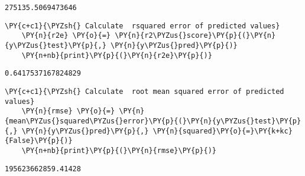         \begin{Verbatim}[commandchars=\\\{\}]
    275135.5069473646
        \end{Verbatim}
    
        \begin{tcolorbox}[breakable, size=fbox, boxrule=1pt, pad at break*=1mm,colback=cellbackground, colframe=cellborder]
    \begin{Verbatim}[commandchars=\\\{\}]
    \PY{c+c1}{\PYZsh{} Calculate  rsquared error of predicted values}
    \PY{n}{r2e} \PY{o}{=} \PY{n}{r2\PYZus{}score}\PY{p}{(}\PY{n}{y\PYZus{}test}\PY{p}{,} \PY{n}{y\PYZus{}pred}\PY{p}{)}
    \PY{n+nb}{print}\PY{p}{(}\PY{n}{r2e}\PY{p}{)}
    \end{Verbatim}
    \end{tcolorbox}
    
        \begin{Verbatim}[commandchars=\\\{\}]
    0.6417537167824829
        \end{Verbatim}
    
        \begin{tcolorbox}[breakable, size=fbox, boxrule=1pt, pad at break*=1mm,colback=cellbackground, colframe=cellborder]
    \begin{Verbatim}[commandchars=\\\{\}]
    \PY{c+c1}{\PYZsh{} Calculate  root mean squared error of predicted values}
    \PY{n}{rmse} \PY{o}{=} \PY{n}{mean\PYZus{}squared\PYZus{}error}\PY{p}{(}\PY{n}{y\PYZus{}test}\PY{p}{,} \PY{n}{y\PYZus{}pred}\PY{p}{,} \PY{n}{squared}\PY{o}{=}\PY{k+kc}{False}\PY{p}{)}
    \PY{n+nb}{print}\PY{p}{(}\PY{n}{rmse}\PY{p}{)}
    \end{Verbatim}
    \end{tcolorbox}
    
        \begin{Verbatim}[commandchars=\\\{\}]
    195623662859.41428
        \end{Verbatim}

